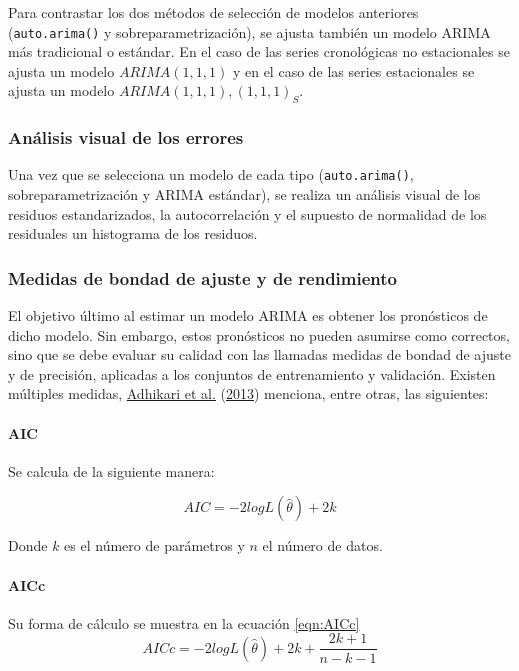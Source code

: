 \documentclass[
]{article}
\begin{document}
Para contrastar los dos métodos de selección de modelos anteriores
(\texttt{auto.arima()} y sobreparametrización), se ajusta también un
modelo ARIMA más tradicional o estándar. En el caso de las series
cronológicas no estacionales se ajusta un modelo \(ARIMA(1,1,1)\) y en
el caso de las series estacionales se ajusta un modelo
\(ARIMA(1,1,1),(1,1,1)_S\).

\subsubsection{Análisis visual de los errores}

Una vez que se selecciona un modelo de cada tipo (\texttt{auto.arima()},
sobreparametrización y ARIMA estándar), se realiza un análisis visual de
los residuos estandarizados, la autocorrelación y el supuesto de
normalidad de los residuales un histograma de los residuos.

\subsubsection{Medidas de bondad de ajuste y de rendimiento}

El objetivo último al estimar un modelo ARIMA es obtener los pronósticos
de dicho modelo. Sin embargo, estos pronósticos no pueden asumirse como
correctos, sino que se debe evaluar su calidad con las llamadas medidas
de bondad de ajuste y de precisión, aplicadas a los conjuntos de
entrenamiento y validación. Existen múltiples medidas,
\protect\hyperlink{ref-medidas}{Adhikari et al.}
(\protect\hyperlink{ref-medidas}{2013}) menciona, entre otras, las
siguientes:

\paragraph{AIC}

Se calcula de la siguiente manera:

\begin{equation}
\label{eqn:AIC}
AIC=-2logL\left(\hat\theta\right)+2k
\end{equation}

Donde \(k\) es el número de parámetros y \(n\) el número de datos.

\paragraph{AICc}

Su forma de cálculo se muestra en la ecuación \eqref{eqn:AICc}
\begin{equation}
\label{eqn:AICc}
AICc=-2logL\left(\hat\theta\right)+2k+\frac{2k+1}{n-k-1}
\end{equation}
\end{document}

